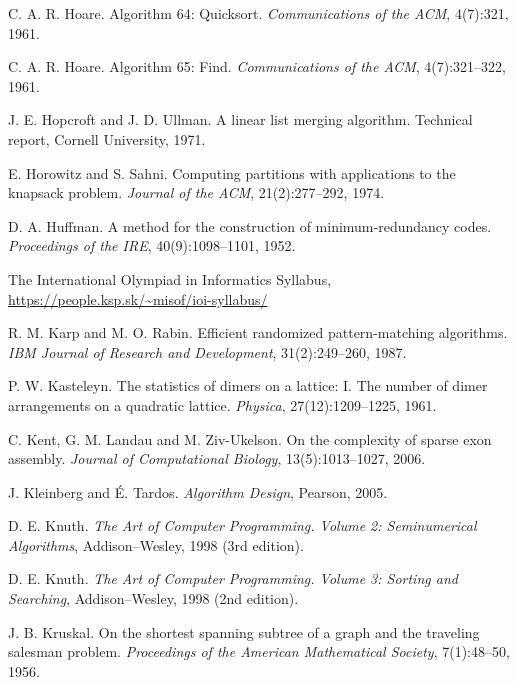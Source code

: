 \begin{thebibliography}{9}
    C. A. R. Hoare.
    Algorithm 64: Quicksort.
    \emph{Communications of the ACM}, 4(7):321, 1961.

    C. A. R. Hoare.
    Algorithm 65: Find.
    \emph{Communications of the ACM}, 4(7):321--322, 1961.

    J. E. Hopcroft and J. D. Ullman.
    A linear list merging algorithm.
    Technical report, Cornell University, 1971.

    E. Horowitz and S. Sahni.
    Computing partitions with applications to the knapsack problem.
    \emph{Journal of the ACM}, 21(2):277--292, 1974.

    D. A. Huffman.
    A method for the construction of minimum-redundancy codes.
    \emph{Proceedings of the IRE}, 40(9):1098--1101, 1952.

    The International Olympiad in Informatics Syllabus,
    \url{https://people.ksp.sk/~misof/ioi-syllabus/}

    R. M. Karp and M. O. Rabin.
    Efficient randomized pattern-matching algorithms.
    \emph{IBM Journal of Research and Development}, 31(2):249--260, 1987.

    P. W. Kasteleyn.
    The statistics of dimers on a lattice: I. The number of dimer arrangements on a quadratic lattice.
    \emph{Physica}, 27(12):1209--1225, 1961.

    C. Kent, G. M. Landau and M. Ziv-Ukelson.
    On the complexity of sparse exon assembly.
    \emph{Journal of Computational Biology}, 13(5):1013--1027, 2006.


    J. Kleinberg and É. Tardos.
    \emph{Algorithm Design}, Pearson, 2005.

    D. E. Knuth.
    \emph{The Art of Computer Programming. Volume 2: Seminumerical Algorithms}, Addison–Wesley, 1998 (3rd edition).

    D. E. Knuth.
    \emph{The Art of Computer Programming. Volume 3: Sorting and Searching}, Addison–Wesley, 1998 (2nd edition).


    J. B. Kruskal.
    On the shortest spanning subtree of a graph and the traveling salesman problem.
    \emph{Proceedings of the American Mathematical Society}, 7(1):48--50, 1956.


\end{thebibliography}
